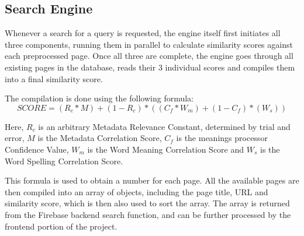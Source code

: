 \subsection{Search Engine}

Whenever a search for a query is requested, the engine itself first initiates all three components, running them in parallel to calculate similarity scores against each preprocessed page.
Once all three are complete, the engine goes through all existing pages in the database, reads their 3 individual scores and compiles them into a final similarity score.

The compilation is done using the following formula:
\[ SCORE = (R_c * M) + (1 - R_c) * ((C_f * W_m) + (1 - C_f) * (W_s)) \]

Here, \(R_c\) is an arbitrary Metadata Relevance Constant, determined by trial and error, \(M\) is the Metadata Correlation Score, \(C_f\) is the meanings processor Confidence Value, \(W_m\) is the Word Meaning Correlation Score and \(W_s\) is the Word Spelling Correlation Score.

This formula is used to obtain a number for each page.
All the available pages are then compiled into an array of objects, including the page title, URL and similarity score, which is then also used to sort the array.
The array is returned from the Firebase backend search function, and can be further processed by the frontend portion of the project.
